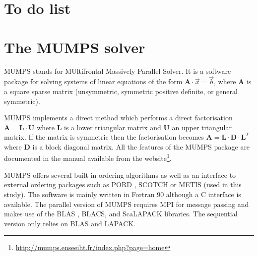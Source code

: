 \section{To do list}



\section{The MUMPS solver}

MUMPS stands for MUltifrontal Massively Parallel Solver. It is a software package 
for solving systems of linear equations of the 
form ${\bm A}\cdot{\vec x} = {\vec b}$, where ${\bm A}$ is a square sparse matrix (unsymmetric, 
symmetric positive definite, or general symmetric). 

MUMPS implements a direct method which performs a direct factorisation
${\bm A} = {\bm L}\cdot{\bm U}$ where ${\bm L}$ is a lower triangular matrix and ${\bm U}$ 
an upper triangular matrix. If the matrix is symmetric then the factorisation becomes
${\bm A} = {\bm L}\cdot{\bm D}\cdot{\bm L}^T$
where ${\bm D}$ is a block diagonal matrix. 
All the features of the MUMPS package are documented in the manual available from the 
website\footnote{\url{http://mumps.enseeiht.fr/index.php?page=home}}.


MUMPS offers several built-in ordering algorithms as well as an 
interface to external ordering packages such as PORD \cite{schu01}, SCOTCH \cite{pell07} 
or METIS \cite{kaku98} (used in this study). 
The software is mainly written in Fortran 90 although a C interface is available. 
The parallel version of MUMPS requires 
MPI \cite{snoh96} for message passing and makes use of the BLAS \cite{dodd90a,dodd90b}, BLACS, and ScaLAPACK
\cite{blcc97} libraries. 
The sequential version only relies on BLAS and LAPACK.

